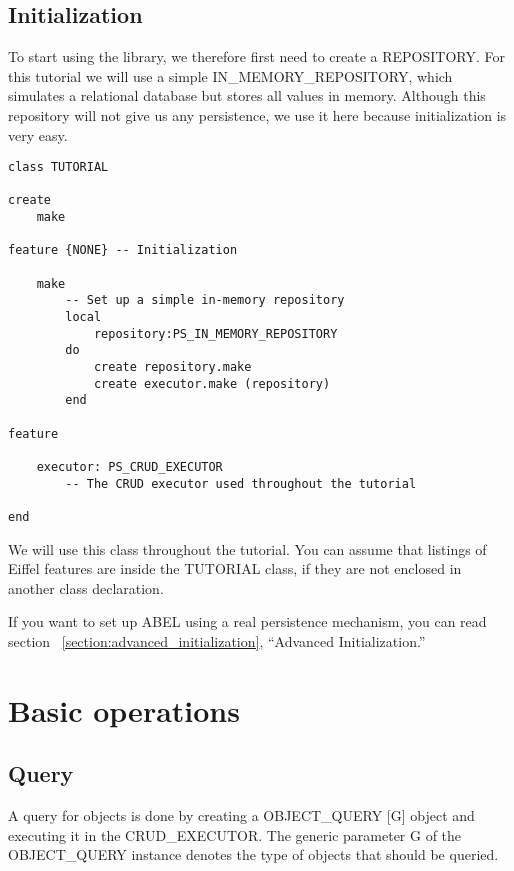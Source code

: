 \subsection{Initialization}

To start using the library, we therefore first need to create a REPOSITORY.
For this tutorial we will use a simple IN\_MEMORY\_REPOSITORY, which simulates a relational database but stores all values in memory.
Although this repository will not give us any persistence, we use it here because initialization is very easy.


\begin{lstlisting}[language=OOSC2Eiffel, captionpos=b, caption={The TUTORIAL class}, label={lst:tutorial_class}]
class TUTORIAL

create
	make

feature {NONE} -- Initialization

	make
		-- Set up a simple in-memory repository
		local
			repository:PS_IN_MEMORY_REPOSITORY
		do
			create repository.make
			create executor.make (repository)
		end

feature
	
	executor: PS_CRUD_EXECUTOR
		-- The CRUD executor used throughout the tutorial

end
\end{lstlisting}

We will use this class throughout the tutorial. You can assume that listings of Eiffel features are inside the TUTORIAL class, if they are not enclosed in another class declaration.

If you want to set up ABEL using a real persistence mechanism, you can read section ~\ref{section:advanced_initialization}, ``Advanced Initialization.''

\section{Basic operations}

\subsection{Query}

A query for objects is done by creating a OBJECT\_QUERY [G] object and executing it in the CRUD\_EXECUTOR.
The generic parameter G of the OBJECT\_QUERY instance denotes the type of objects that should be queried.

